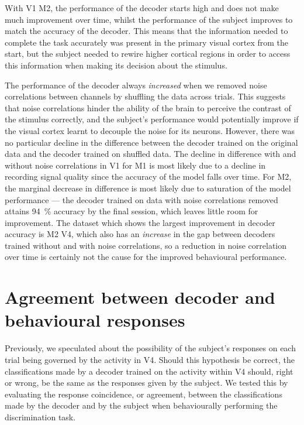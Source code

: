 With \ac{V1} \ac{M2}, the performance of the decoder starts high and does not make much improvement over time, whilst the performance of the subject improves to match the accuracy of the decoder.
This means that the information needed to complete the task accurately was present in the primary visual cortex from the start, but the subject needed to rewire higher cortical regions in order to access this information when making its decision about the stimulus.

The performance of the decoder always \textit{increased} when we removed noise correlations between channels by shuffling the data across trials.
This suggests that noise correlations hinder the ability of the brain to perceive the contrast of the stimulus correctly, and the subject's performance would potentially improve if the visual cortex learnt to decouple the noise for its neurons.
However, there was no particular decline in the difference between the decoder trained on the original data and the decoder trained on shuffled data.
The decline in difference with and without noise correlations in \ac{V1} for \ac{M1} is most likely due to a decline in recording signal quality since the accuracy of the model falls over time.
For \ac{M2}, the marginal decrease in difference is most likely due to saturation of the model performance --- the decoder trained on data with noise correlations removed attains \SI{94}{\percent} accuracy by the final session, which leaves little room for improvement.
The dataset which shows the largest improvement in decoder accuracy is \ac{M2} \ac{V4}, which also has an \textit{increase} in the gap between decoders trained without and with noise correlations, so a reduction in noise correlation over time is certainly not the cause for the improved behavioural performance.


\section{Agreement between decoder and behavioural responses}
\label{sec:pl_agreement}

Previously, we speculated about the possibility of the subject's responses on each trial being governed by the activity in \ac{V4}.
Should this hypothesis be correct, the classifications made by a decoder trained on the activity within \ac{V4} should, right or wrong, be the same as the responses given by the subject.
We tested this by evaluating the response coincidence, or agreement, between the classifications made by the decoder and by the subject when behaviourally performing the discrimination task.

